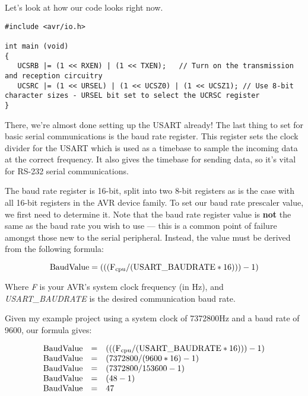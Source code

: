 \documentclass[a4paper,oneside,notitlepage]{book}
\begin{document}
Let's look at how our code looks right now.

\begin{center}
\begin{lstlisting}
#include <avr/io.h>

int main (void)
{
   UCSRB |= (1 << RXEN) | (1 << TXEN);   // Turn on the transmission and reception circuitry
   UCSRC |= (1 << URSEL) | (1 << UCSZ0) | (1 << UCSZ1); // Use 8-bit character sizes - URSEL bit set to select the UCRSC register
}
\end{lstlisting}
\end{center}

There, we're almost done setting up the USART already! The last thing to set for basic serial communications is the baud rate register. This register sets the clock divider for the USART which is used as a timebase to sample the incoming data at the correct frequency. It also gives the timebase for sending data, so it's vital for RS-232 serial communications.

The baud rate register is 16-bit, split into two 8-bit registers as is the case with all 16-bit registers in the AVR device family. To set our baud rate prescaler value, we first need to determine it. Note that the baud rate register value is \textbf{not} the same as the baud rate you wish to use --- this is a common point of failure amongst those new to the serial peripheral. Instead, the value must be derived from the following formula:

\begin{displaymath}
    \text{BaudValue} = (((\text{F\ensuremath{_{\textrm{cpu}}}} / (\text{USART\_BAUDRATE} * 16))) - 1)
\end{displaymath}

Where \emph{F} is your AVR's system clock frequency (in Hz), and \emph{USART\_BAUDRATE} is the desired communication baud rate.

Given my example project using a system clock of 7372800Hz and a baud rate of 9600, our formula gives:

\begin{displaymath}
\begin{array}{rcl}
    \text{BaudValue} & = & (((\text{F\ensuremath{_{\textrm{cpu}}}} / (\text{USART\_BAUDRATE} * 16))) - 1) \\
    \text{BaudValue} & = & (7372800 / (9600 * 16) - 1) \\
    \text{BaudValue} & = & (7372800 / 153600 - 1) \\
    \text{BaudValue} & = & (48 - 1) \\
    \text{BaudValue} & = & 47 \\
\end{array}
\end{displaymath}
\end{document}
